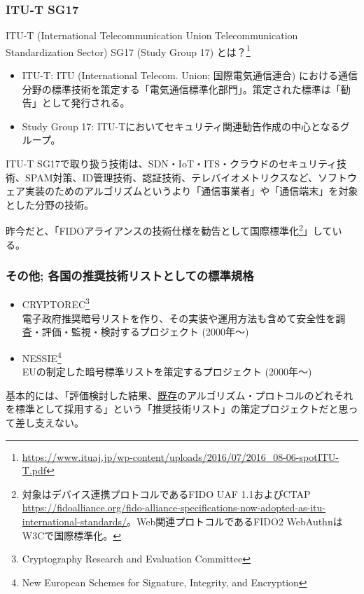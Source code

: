 \documentclass[12pt,dvipdfmx]{beamer}
\begin{document}
\begin{frame}
\frametitle{ITU-T SG17}
\begin{block}{\footnotesize ITU-T (International Telecommunication Union Telecommunication Standardization Sector) SG17 (Study Group 17) とは？\footnote[frame]{\scriptsize \url{https://www.ituaj.jp/wp-content/uploads/2016/07/2016_08-06-spotITU-T.pdf}}}
\begin{itemize}
 \item ITU-T: ITU (International Telecom. Union; 国際電気通信連合) における通信分野の標準技術を策定する「電気通信標準化部門」。策定された標準は「勧告」として発行される。
 \item Study Group 17: ITU-Tにおいてセキュリティ関連勧告作成の中心となるグループ。
\end{itemize}
\end{block}

\end{frame}

\begin{frame}
ITU-T SG17で取り扱う技術は、SDN・IoT・ITS・クラウドのセキュリティ技術、SPAM対策、ID管理技術、認証技術、テレバイオメトリクスなど、ソフトウェア実装のためのアルゴリズムというより\alert{「通信事業者」や「通信端末」を対象とした分野の技術}。

\vspace{1ex}

昨今だと、「FIDOアライアンスの技術仕様を勧告として国際標準化\footnote[frame]{\scriptsize 対象はデバイス連携プロトコルであるFIDO UAF 1.1およびCTAP \url{https://fidoalliance.org/fido-alliance-specifications-now-adopted-as-itu-international-standards/}。Web関連プロトコルであるFIDO2 WebAuthnはW3Cで国際標準化。}」している。

\end{frame}


\begin{frame}
\frametitle{その他; 各国の推奨技術リストとしての標準規格}
\small
\begin{itemize}
 \item CRYPTOREC\footnote[frame]{\scriptsize Cryptography Research and Evaluation Committee} \\
電子政府推奨暗号リストを作り、その実装や運用方法も含めて安全性を調査・評価・監視・検討するプロジェクト (2000年〜)
 \item NESSIE\footnote[frame]{\scriptsize New European Schemes for Signature, Integrity, and Encryption}\\
EUの制定した暗号標準リストを策定するプロジェクト (2000年〜)
\end{itemize}
基本的には、「評価検討した結果、\underline{既存}のアルゴリズム・プロトコルのどれそれを標準として採用する」という\alert{「推奨技術リスト」の策定プロジェクト}だと思って差し支えない。
\end{frame}
\end{document}
